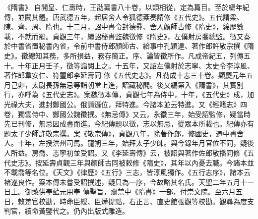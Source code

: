 
\begin{pinyinscope}

 《隋書》
 自開皇、仁壽時，王劭纂書八十卷，以類相從，定為篇目。至於編年紀傳，並闕其體。唐武德五年，起居舍人令狐德棻奏請修《五代史》。五代謂梁、陳、齊、周、隋也。十二月，詔中書令封德彞、舍人顏師古修《隋史》，綿歷數載，不就而罷。貞觀三年，續詔秘書監魏徵修《隋史》，左僕射房喬總監。徵又奏於中書省置秘書內省，令前中書侍郎顏師古、給事中孔穎達、著作郎許敬宗撰《隋史》。徵總知其務，多所損益，務存簡正。序、論皆徵所作。凡成帝紀五，列傳五十。十年正月壬子，徵等詣闕上之。十五年，又詔左僕射於志寧、太史令李淳風、著作郎韋安仁、符璽郎李延壽同
 修《五代史志》。凡勒成十志三十卷。顯慶元年五月己卯，太尉長孫無忌等詣朝堂上進，詔藏秘閣。後又編第入《隋書》，其實別行，亦呼為《五代史志》。案魏徵本傳，貞觀七年為侍中，十年，《五代史》成，加光祿大夫，進封鄭國公。俄請遜位，拜特進。今諸本並云特進。又《經籍志》四卷，獨雲侍中、鄭國公魏徵撰。《無忌傳》又云，永徽三年，始受詔監修，疑當時先已刊修，無忌因成書而進。今紀傳題以徵，志以無忌，從眾本所載也。紀傳亦有題太子少師許敬宗撰。案《敬宗傳》，貞觀八年，除著作郎，修國史，遷中書舍人。十年，左授洪州司馬。龍朔三年，始拜太子少師。與今錄年月官位不同，疑後人所益。房喬、志寧初並受詔。又《李延壽傳》云，被詔與著作佐郎敬播同修《五代史志》。按延壽貞觀三年與顏師古同被敕修《隋史》，其年以內憂去職。今諸本並不載喬等名位。《天文》《律歷》《五行》三志，皆淳風獨作。《五行志序》，諸本云褚遂良作。案本傳未嘗受詔撰述，疑只為一序，今故略其名氏。天聖二年五月十一日上。御藥供奉藍元用奉
 傳聖旨，齎禁中《隋書》一部，付崇文院。至六月五日，敕差官校勘，時命臣綬、臣燁提點，右正言、直史館張觀等校勘。觀尋為度支判官，續命黃鑒代之。仍內出版式雕造。



\end{pinyinscope}